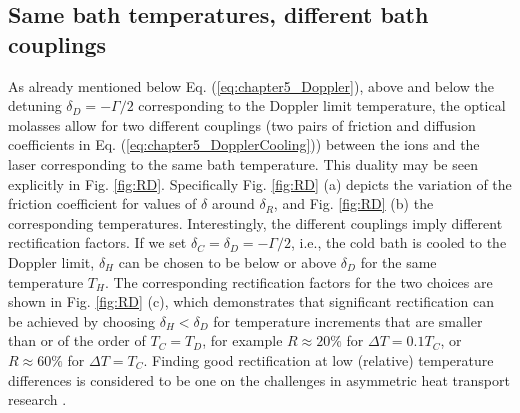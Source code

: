 \subsection{Same bath temperatures, different bath couplings\label{TC}}
%
%
As already mentioned below Eq. (\ref{eq:chapter5_Doppler}), above and below the detuning  $\delta_D=-\Gamma/2$ corresponding to the  Doppler limit temperature, the optical molasses allow for
two different couplings (two pairs of friction and diffusion coefficients in Eq. (\ref{eq:chapter5_DopplerCooling})) between the ions and the laser corresponding to the same bath temperature.
This duality may be seen explicitly in Fig. \ref{fig:RD}. Specifically Fig. \ref{fig:RD} (a) depicts the variation of the friction coefficient for values of $\delta$ around $\delta_R$,  and Fig. \ref{fig:RD} (b) the corresponding temperatures.
Interestingly, the different couplings imply different rectification factors.
If we set $\delta_C = \delta_D=-\Gamma / 2$,  i.e., the cold bath is cooled to the Doppler limit, $\delta_H$ can be chosen to be below or above $\delta_D$ for the same temperature $T_H$. The corresponding rectification factors for the two choices
are shown in  Fig. \ref{fig:RD} (c),
which
demonstrates that significant rectification can be achieved by choosing $\delta_H<\delta_D$ for temperature increments that
are smaller than or of the order of $T_C=T_D$, for example $R\approx 20\%$ for $\Delta T=0.1 T_C$, or $R\approx 60\%$
for $\Delta T= T_C$.  Finding good rectification at low (relative) temperature differences is considered to be one on the challenges
in asymmetric heat transport research \cite{Zhang2015}.


